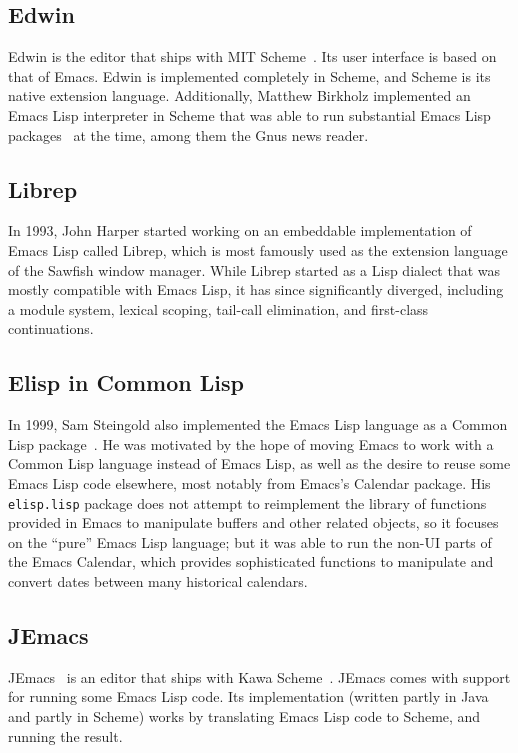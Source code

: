 \documentclass[format=acmsmall,screen]{acmart}
\newcommand \Elisp {Emacs Lisp}
\begin{document}
\subsection{Edwin}

Edwin is the editor that ships with MIT Scheme~\cite{MITScheme2014}. %
Its user interface is based on that of Emacs.  Edwin is implemented
completely in Scheme, and Scheme is its native extension language.
Additionally, Matthew Birkholz implemented an \Elisp{} interpreter
in Scheme that was able to run substantial \Elisp{}
packages~\cite{Birkholz1993} at the time, among them the Gnus news reader.

\subsection{Librep}

In 1993, John Harper started working on an embeddable implementation of
\Elisp{} called Librep, which is most famously used as the extension
language of the Sawfish window manager.  While Librep started as a Lisp
dialect that was mostly compatible with \Elisp{}, it has since significantly
diverged, including a module system, lexical scoping, tail-call elimination,
and first-class continuations.

\subsection{Elisp in Common Lisp}

In 1999, Sam Steingold also implemented the \Elisp{} language as a Common
Lisp package~\cite{Steingold99}.  He was motivated by the hope of moving
Emacs to work with a Common Lisp language instead of \Elisp{}, as well as
the desire to reuse some Emacs Lisp code elsewhere, most notably from
Emacs's Calendar package.  His \texttt{elisp.lisp} package does not attempt
to reimplement the library of functions provided in Emacs to manipulate
buffers and other related objects, so it focuses on the ``pure'' \Elisp{}
language; but it was able to run the non-UI parts of the Emacs Calendar,
which provides sophisticated functions to manipulate and convert dates
between many historical calendars.

\subsection{JEmacs}

JEmacs~\cite{Bothner2001} is an editor that ships with Kawa
Scheme~\cite{KawaScheme}.  JEmacs comes with support for running some
\Elisp{} code.  Its implementation (written partly in Java and
partly in Scheme) works by translating \Elisp{} code to Scheme, and
running the result.
\end{document}
